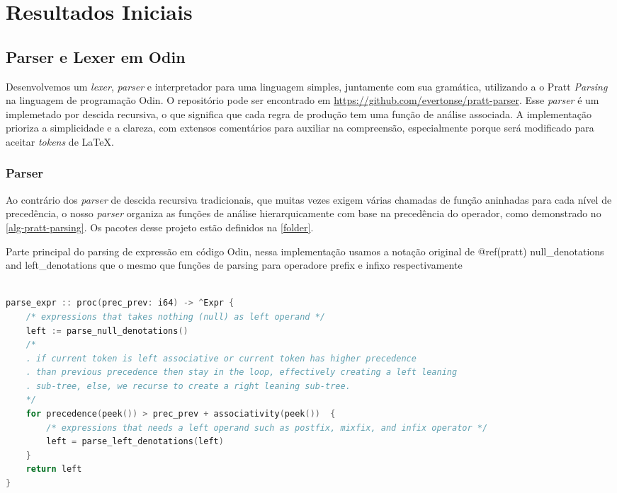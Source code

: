 \documentclass[english, 
               brazil, 
               bsc] %
               {dcomp-abntex2}
\begin{document}
\chapter{Resultados Iniciais}
\label{resultadosiniciais}

\section{Parser e Lexer em Odin}\label{parser}

Desenvolvemos um \textit{lexer}, \textit{parser} e interpretador para uma linguagem simples, juntamente com sua gramática, utilizando a o Pratt \textit{Parsing} na linguagem de programação Odin. O repositório pode ser encontrado em \url{https://github.com/evertonse/pratt-parser}. Esse \textit{parser} é um implemetado por descida recursiva, o que significa que cada regra de produção tem uma função de análise associada. A implementação prioriza a simplicidade e a clareza, com extensos comentários para auxiliar na compreensão, especialmente porque será modificado para aceitar \textit{tokens} de \LaTeX.

\subsection{Parser}

Ao contrário dos \textit{parser} de descida recursiva tradicionais, que muitas vezes exigem várias chamadas de função aninhadas para cada nível de precedência, o nosso \textit{parser} organiza as funções de análise hierarquicamente com base na precedência do operador, como demonstrado no \autoref{alg-pratt-parsing}. Os pacotes desse projeto estão definidos na \autoref{folder}.


\begin{algoritmo}[H]
  \caption{Parte principal do parsing de expressão em código Odin, nessa implementação usamos a notação original de @ref(pratt) null\_denotations and left\_denotations que o mesmo que funções de parsing para operadore prefix e infixo respectivamente}
	\label{alg-pratt-parsing}
  \begin{lstlisting}[language=C]

parse_expr :: proc(prec_prev: i64) -> ^Expr {
    /* expressions that takes nothing (null) as left operand */
    left := parse_null_denotations() 
    /*
    . if current token is left associative or current token has higher precedence
    . than previous precedence then stay in the loop, effectively creating a left leaning
    . sub-tree, else, we recurse to create a right leaning sub-tree.
    */
    for precedence(peek()) > prec_prev + associativity(peek())  {
        /* expressions that needs a left operand such as postfix, mixfix, and infix operator */
        left = parse_left_denotations(left)
    }
    return left
}

  \end{lstlisting}
\end{algoritmo}
\end{document}
